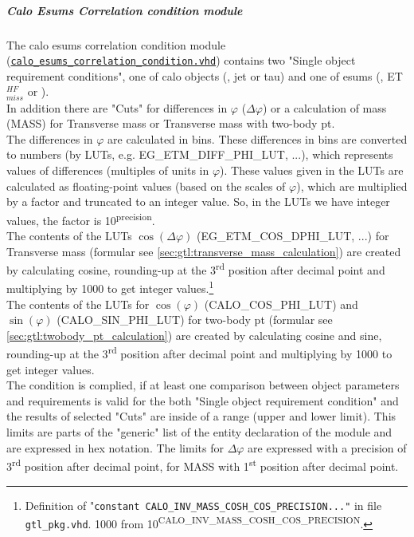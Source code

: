 \subparagraph{Calo Esums Correlation condition module}
\label{sec:gtl:calo_esums_correlation_condition_module}

The calo esums correlation condition module (\href{https://github.com/cms-l1-globaltrigger/mp7_ugt_legacy/tree/master/firmware/hdl/gt_mp7_core/gtl_fdl_wrapper/gtl/calo_esums_correlation_condition.vhd}{\texttt{calo\_esums\_correlation\_condition.vhd}}) contains two "Single object requirement conditions", one of calo objects (\egamma, jet or tau) and one of esums (\etm, ET$_{miss}^{HF}$ or \htm).\\
In addition there are "Cuts" for differences in $\varphi$ ($\Delta\varphi$) or a calculation of mass (MASS) for Transverse mass or Transverse mass with two-body pt.\\
The differences in $\varphi$ are calculated in bins. 
These differences in bins are converted to numbers (by LUTs, e.g. \small{EG\_ETM\_DIFF\_PHI\_LUT}\normalsize, ...),
which represents values of differences (multiples of units in $\varphi$).
These values given in the LUTs are calculated as floating-point values (based on the scales of $\varphi$), which are multiplied by a factor and truncated to an integer value.
So, in the LUTs we have integer values, the factor is 10\textsuperscript{\tiny{precision}\normalsize}.\\

The contents of the LUTs $\cos(\Delta\varphi)$ (\small{EG\_ETM\_COS\_DPHI\_LUT}\normalsize, ...) for Transverse mass (formular see \ref{sec:gtl:transverse_mass_calculation}) 
are created by calculating cosine, rounding-up at the 3\textsuperscript{rd}
position after decimal point and multiplying by 1000 to get integer values.\footnote{Definition of "\texttt{constant \small{CALO\_INV\_MASS\_COSH\_COS\_PRECISION}\normalsize ..."} in file \texttt{gtl\_pkg.vhd}.
1000 from 10\textsuperscript{\tiny{CALO\_INV\_MASS\_COSH\_COS\_PRECISION}}\normalsize.}\\
The contents of the LUTs for $\cos(\varphi)$ (\small{CALO\_COS\_PHI\_LUT}\normalsize) and $\sin(\varphi)$ (\small{CALO\_SIN\_PHI\_LUT}\normalsize) for two-body pt 
(formular see \ref{sec:gtl:twobody_pt_calculation}) are created by calculating cosine and sine, rounding-up at the 3\textsuperscript{rd} position after decimal point and multiplying by 1000 to get integer values.\\
The condition is complied, if at least one comparison between object parameters and requirements is valid for the both "Single object requirement condition"
and the results of selected "Cuts" are inside of a range (upper and lower limit).
This limits are parts of the "generic" list of the entity declaration of the module and are expressed in hex notation. The limits for $\Delta\varphi$
are expressed with a precision of 3\textsuperscript{rd} position after decimal point, for MASS with 1\textsuperscript{st} position after decimal point.

